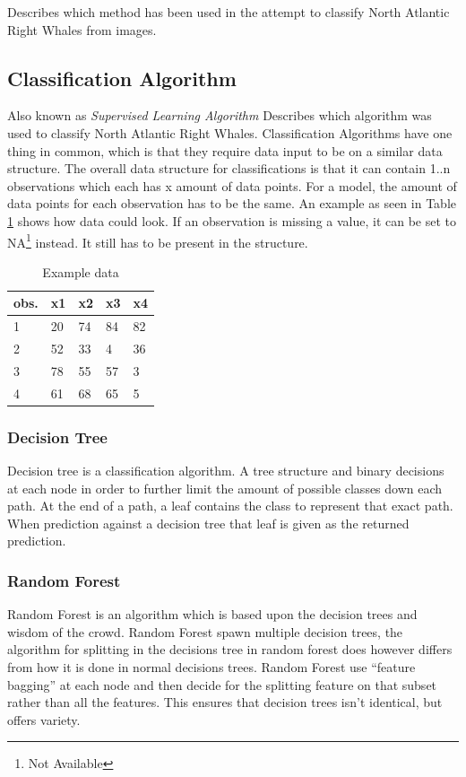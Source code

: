 Describes which method has been used in the attempt to classify North Atlantic Right Whales from images.

\subsection{Classification Algorithm}
Also known as \emph{Supervised Learning Algorithm}
Describes which algorithm was used to classify North Atlantic Right Whales. Classification Algorithms have one thing in common, which is that they require data input to be on a similar data structure.
The overall data structure for classifications is that it can contain 1..n observations which each has x amount of data points. For a model, the amount of data points for each observation has to be the same. An example as seen in Table \ref{tab:example data} shows how data could look.
If an observation is missing a value, it can be set to NA\footnote{Not Available} instead. It still has to be present in the structure.

\begin{table}
  \centering
  \caption{Example data}
  \label{tab:example data}
  \begin{tabularx}{\linewidth}{|l|X|X|X|X|} \hline
    obs. & x1 & x2 & x3 & x4 \\ \hline
    1    & 20 & 74 & 84 & 82 \\ \hline
    2    & 52 & 33 & 4  & 36 \\ \hline
    3    & 78 & 55 & 57 & 3  \\ \hline
    4    & 61 & 68 & 65 & 5  \\ \hline
  \end{tabularx}
\end{table}

\subsubsection{Decision Tree}
Decision tree is a classification algorithm. A tree structure and binary decisions at each node in order to further limit the amount of possible classes down each path.
At the end of a path, a leaf contains the class to represent that exact path.
When prediction against a decision tree that leaf is given as the returned prediction.

\subsubsection{Random Forest}
Random Forest is an algorithm which is based upon the decision trees and wisdom of the crowd.
Random Forest spawn multiple decision trees, the algorithm for splitting in the decisions tree in random forest does however differs from how it is done in normal decisions trees.
Random Forest use ``feature bagging'' at each node and then decide for the splitting feature on that subset rather than all the features. This ensures that decision trees isn't identical, but offers variety.

